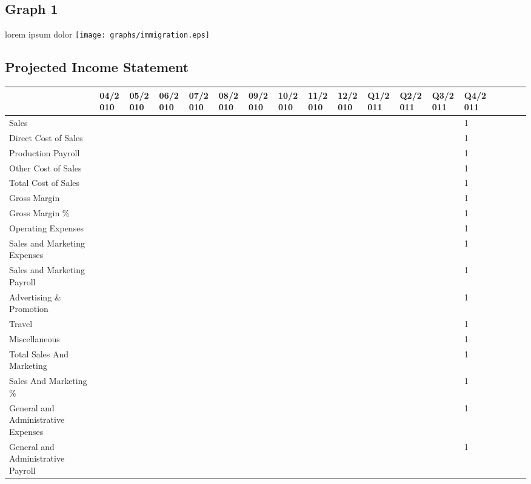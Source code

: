 \documentclass[11pt]{article}
\begin{document}
\subsection{Graph 1}
lorem ipsum dolor
\texttt{[image: graphs/immigration.eps]}
\newpage
\thispagestyle{empty}
\begin{landscape}
\subsection{Projected Income Statement}
\begin{scriptsize}
\begin{tabular}{ | l | l | l | l | l | l | l | l | l | l | l | l | l | l | l | l | l | l |}\hline
  & 04/2010 & 05/2010 & 06/2010 & 07/2010 & 08/2010 & 09/2010 & 10/2010 & 11/2010 & 12/2010 & Q1/2011 & Q2/2011 & Q3/2011 & Q4/2011 \\ \hline
  Sales & & & & & & & & & & & & & 1\\ \hline
  Direct Cost of Sales & & & & & & & & & & & & & 1 \\ \hline
  Production Payroll & & & & & & & & & & & & & 1 \\ \hline
  Other Cost of Sales & & & & & & & & & & & & & 1 \\ \hline
  Total Cost of Sales & & & & & & & & & & & & & 1 \\ \hline
  Gross Margin & & & & & & & & & & & & & 1 \\ \hline
  Gross Margin \% & & & & & & & & & & & & & 1 \\ \hline
  Operating Expenses & & & & & & & & & & & & & 1 \\ \hline
  Sales and Marketing Expenses & & & & & & & & & & & & & 1 \\ \hline
  Sales and Marketing Payroll & & & & & & & & & & & & & 1 \\ \hline
  Advertising \& Promotion & & & & & & & & & & & & & 1 \\ \hline
  Travel & & & & & & & & & & & & & 1 \\ \hline
  Miscellaneous & & & & & & & & & & & & & 1 \\ \hline
  Total Sales And Marketing & & & & & & & & & & & & & 1 \\ \hline
  Sales And Marketing \% & & & & & & & & & & & & & 1 \\ \hline
  General and Administrative Expenses & & & & & & & & & & & & & 1 \\ \hline
  General and Administrative Payroll & & & & & & & & & & & & & 1 \\ \hline

\end{tabular}
\end{scriptsize}
\end{landscape}
\end{document}
